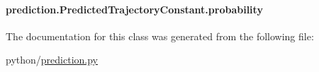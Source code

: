 \hypertarget{classprediction_1_1PredictedTrajectoryConstant_a25a782bac3d4c5b57c76552c9b0fb34b}{
\paragraph[{probability}]{\setlength{\rightskip}{0pt plus 5cm}prediction.\-Predicted\-Trajectory\-Constant.\-probability}}\label{classprediction_1_1PredictedTrajectoryConstant_a25a782bac3d4c5b57c76552c9b0fb34b}


The documentation for this class was generated from the following file\-:\begin{DoxyCompactItemize}
\item 
python/\hyperlink{prediction_8py}{prediction.\-py}\end{DoxyCompactItemize}
